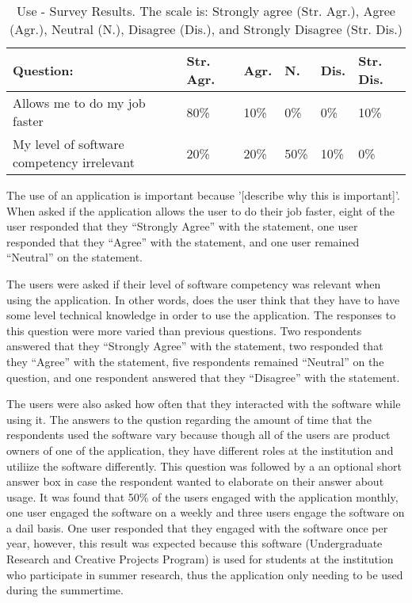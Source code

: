 \begin{table}
\caption{Use - Survey Results. The scale is: Strongly agree (Str. Agr.), Agree (Agr.), Neutral (N.), Disagree (Dis.), and Strongly Disagree (Str. Dis.)}
\label{table:usersatisfaction}
\begin{tabular}{p{2.6cm}p{.75cm}p{.75cm}p{.75cm}p{.75cm}p{.75cm}}
Question: & Str. Agr. & Agr. & N. & Dis. & Str. Dis. \\
 \hline
Allows me to do my job faster & 80\% & 10\% & 0\% & 0\% & 10\% \\
My level of software competency irrelevant & 20\% & 20\% & 50\% & 10\% & 0\% \\
\end{tabular}
\end{table}

The use of an application is important because '[describe why this is important]'. When asked if the application allows the user to do their job faster, eight of the user responded that they ``Strongly Agree'' with the statement, one user responded that they ``Agree'' with the statement, and one user remained ``Neutral'' on the statement.

The users were asked if their level of software competency was relevant when using the application. In other words, does the user think that they have to have some level technical knowledge in order to use the application. The responses to this question were more varied than previous questions. Two respondents answered that they ``Strongly Agree'' with the statement,  two responded that they ``Agree'' with the statement, five respondents remained ``Neutral'' on the question, and one respondent answered that they ``Disagree'' with the statement.

The users were also asked how often that they interacted with the software while using it. The answers to the qustion regarding the amount of time that the respondents used the software vary because though all of the users are product owners of one of the application, they have different roles at the institution and utiliize the software differently. This question was followed by a an optional short answer box in case the respondent wanted to elaborate on their answer about usage. It was found that 50\% of the users engaged with the application monthly, one user engaged the software on a weekly and three users engage the software on a dail basis. One user responded that they engaged with the software once per year, however, this result was expected because this software (Undergraduate Research and Creative Projects Program) is used for students at the institution who participate in summer research, thus the application only needing to be used during the summertime.

